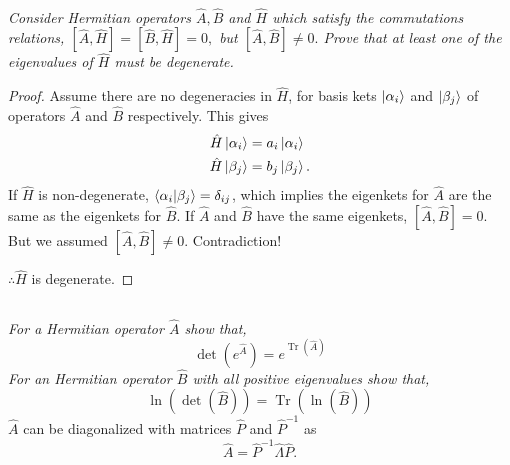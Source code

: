 \documentclass[12pt, letterpaper]{article}
\begin{document}
\subsection{}
\textit{Consider Hermitian operators $\hat{A}, \hat{B}$ and $\hat{H}$ which satisfy the commutations relations, $[\hat{A}, \hat{H}]=[\hat{B}, \hat{H}]=0,$ but $[\hat{A}, \hat{B}] \neq 0 .$ Prove that at least one of the eigenvalues of $\hat{H}$ must be degenerate.}
\begin{proof}
Assume there are no degeneracies in $\hat H$, for basis kets $\ket{\alpha_i}$ and $\ket{\beta_j}$ of operators $\hat A$ and $\hat B$ respectively. This gives
\begin{align*}
    \hat H \ket{\alpha_i} &= a_i \ket{\alpha_i}\\
    \hat H \ket{\beta_j} &= b_j \ket{\beta_j}   . 
\end{align*}
If $\hat H$ is non-degenerate, $\bra{\alpha_i}\ket{\beta_j} = \delta_{ij}$, which implies the eigenkets for $\hat A$ are the same as the eigenkets for $\hat B$. If $\hat A$ and $\hat B$ have the same eigenkets, $[\hat A,\hat B] = 0$. But we assumed $[\hat A,\hat B] \neq 0$. Contradiction!

$\therefore \hat H $ is degenerate.
\end{proof} 


\subsection{}
\textit{For a Hermitian operator $\hat{A}$ show that,
$$
\operatorname{det}\left(e^{\hat{A}}\right)=e^{\operatorname{Tr}(\hat{A})}
$$
For an Hermitian operator $\hat{B}$ with all positive eigenvalues show that,
$$
\ln (\operatorname{det}(\hat{B}))=\operatorname{Tr}(\ln (\hat{B}))
$$
}
$\hat A$ can be diagonalized with matrices $\hat P$ and $\hat{P}^{-1}$ as 
$$
\hat A = \hat{P}^{-1} \hat \Lambda \hat P. 
$$
\end{document}
